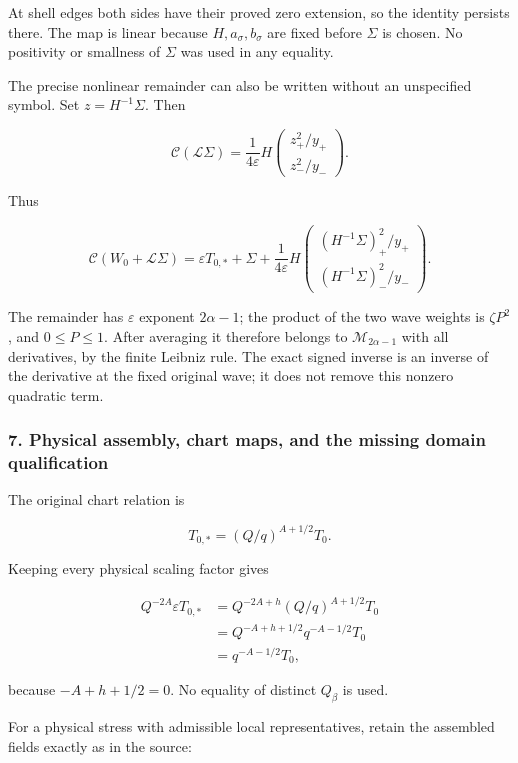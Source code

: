 \documentclass[10pt,a4paper]{article}
\begin{document}
At shell edges both sides have their proved zero extension, so the identity persists there. The map is linear because \(H,a_\sigma,b_\sigma\) are fixed before \(\Sigma\) is chosen. No positivity or smallness of \(\Sigma\) was used in any equality.

The precise nonlinear remainder can also be written without an unspecified symbol. Set \(z=H^{-1}\Sigma\). Then

\[
\mathcal C(\mathcal L\Sigma)
=\frac1{4\varepsilon}H
\begin{pmatrix}z_+^2/y_+\\z_-^2/y_-\end{pmatrix}.
\]

Thus

\[
\mathcal C(W_0+\mathcal L\Sigma)
=\varepsilon T_{0,*}+\Sigma+
\frac1{4\varepsilon}H
\begin{pmatrix}(H^{-1}\Sigma)_+^2/y_+\\(H^{-1}\Sigma)_-^2/y_-\end{pmatrix}.
\]

The remainder has \(\varepsilon\) exponent \(2\alpha-1\); the product of the two wave weights is \(\zeta P^2\), and \(0\le P\le1\). After averaging it therefore belongs to \(\mathcal M_{2\alpha-1}\) with all derivatives, by the finite Leibniz rule. The exact signed inverse is an inverse of the derivative at the fixed original wave; it does not remove this nonzero quadratic term.

\subsubsection{7. Physical assembly, chart maps, and the missing domain qualification}

The original chart relation is

\[
T_{0,*}=(Q/q)^{A+1/2}T_0.
\]

Keeping every physical scaling factor gives

\[
\begin{aligned}
Q^{-2A}\varepsilon T_{0,*}
&=Q^{-2A+h}(Q/q)^{A+1/2}T_0\\
&=Q^{-A+h+1/2}q^{-A-1/2}T_0\\
&=q^{-A-1/2}T_0,
\end{aligned}
\]

because \(-A+h+1/2=0\). No equality of distinct \(Q_\beta\) is used.

For a physical stress with admissible local representatives, retain the assembled fields exactly as in the source:
\end{document}
